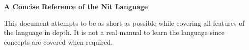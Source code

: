 \documentclass[10pt]{article}
\title{\thedoctitle}
\author{Jean Privat}
\date{\today}
\newcommand\goto[1]{\hyperref[#1]{{\color{red}\scriptsize[\ref*{#1}]}}}
\begin{document}
\setlength\columnsep{8pt} %
\begin{multicols}{2}
\setlength\columnsep{4pt} %

\noindent\textbf{A Concise Reference of the Nit Language}

This document attempts to be as short as possible while covering all features of the language in depth.
It is not a real manual to learn the language since concepts are covered when required.


\end{multicols}
\end{document}

